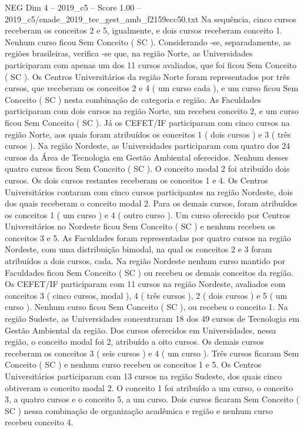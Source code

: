 \begin{textsample}{NEG Dim 4 – 2019\_c5 – Score 1.00 – 2019\_c5/enade\_2019\_tec\_gest\_amb\_f2159ecc50.txt}
Na sequência, cinco cursos receberam os conceitos 2 e 5, igualmente, e dois cursos receberam conceito 1.
Nenhum curso ficou Sem Conceito ( SC ).
Considerando -se, separadamente, as regiões brasileiras, verifica -se que, na região Norte, as Universidades participaram com apenas um dos 11 cursos avaliados, que foi ficou Sem Conceito ( SC ).
Os Centros Universitários da região Norte foram representados por três cursos, que receberam os conceitos 2 e 4 ( um curso cada ), e um curso ficou Sem Conceito ( SC ) nesta combinação de categoria e região.
As Faculdades participaram com dois cursos na região Norte, um recebeu conceito 2, e um curso ficou Sem Conceito ( SC ).
Já os CEFET/IF participaram com cinco cursos na região Norte, aos quais foram atribuídos os conceitos 1 ( dois cursos ) e 3 ( três cursos ).
Na região Nordeste, as Universidades participaram com quatro dos 24 cursos da Área de Tecnologia em Gestão Ambiental oferecidos.
Nenhum desses quatro cursos ficou Sem Conceito ( SC ).
O conceito modal 2 foi atribuído dois cursos.
Os dois cursos restantes receberam os conceitos 1 e 4.
Os Centros Universitários contaram com cinco cursos participantes na região Nordeste, dois dos quais receberam o conceito modal 2.
Para os demais cursos, foram atribuídos os conceitos 1 ( um curso ) e 4 ( outro curso ).
Um curso oferecido por Centros Universitários no Nordeste ficou Sem Conceito ( SC ) e nenhum recebeu os conceitos 3 e 5.
As Faculdades foram representadas por quatro cursos na região Nordeste, com uma distribuição bimodal, na qual os conceitos 2 e 3 foram atribuídos a dois cursos, cada.
Na região Nordeste nenhum curso mantido por Faculdades ficou Sem Conceito ( SC ) ou recebeu os demais conceitos da região.
Os CEFET/IF participaram com 11 cursos na região Nordeste, avaliados com conceitos 3 ( cinco cursos, modal ), 4 ( três cursos ), 2 ( dois cursos ) e 5 ( um curso ).
Nenhum curso ficou Sem Conceito ( SC ), ou recebeu o conceito 1.
Na região Sudeste, as Universidades concentraram 18 dos 49 cursos de Tecnologia em Gestão Ambiental da região.
Dos cursos oferecidos em Universidades, nessa região, o conceito modal foi 2, atribuído a oito cursos.
Os demais cursos receberam os conceitos 3 ( seis cursos ) e 4 ( um curso ).
Três cursos ficaram Sem Conceito ( SC ) e nenhum curso recebeu os conceitos 1 e 5.
Os Centros Universitários participaram com 13 cursos na região Sudeste, dos quais cinco obtiveram o conceito modal 2.
O conceito 1 foi atribuído a um curso, o conceito 3, a quatro cursos e o conceito 5, a um curso.
Dois cursos ficaram Sem Conceito ( SC ) nessa combinação de organização acadêmica e região e nenhum curso recebeu conceito 4.

\end{textsample}
